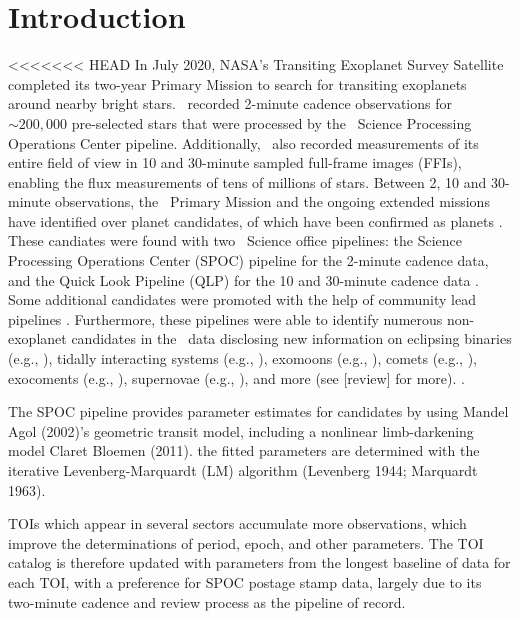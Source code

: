 \documentclass[floatfix,ApJL,twocolumn]{aastex631}
\begin{document}


\section{Introduction} \label{sec:intro}

<<<<<<< HEAD
In July 2020, NASA’s Transiting Exoplanet Survey Satellite \citep{Ricker:2015:JATIS} completed its two-year Primary Mission to search for transiting exoplanets around nearby bright stars.
\tess\ recorded 2-minute cadence observations for $\sim200,000$ pre-selected stars that were processed by the \tess\ Science Processing Operations Center \citep{Jenkins:2016:SPIE} pipeline.
Additionally, \tess\ also recorded measurements of its entire field of view in 10 and 30-minute sampled full-frame images (FFIs), enabling the flux measurements of tens of millions of stars.
Between 2, 10 and 30-minute observations, the \tess\ Primary Mission and the ongoing extended missions have identified over \red{$\numTessCandidates$} planet candidates, \red{$\numTessPlanets$} of which have been confirmed as planets \citep{Stassun:2018:AJ, Stassun:2019:AJ, Guerrero:2021:ApJS, Guerrero:2021:AAS}.
These candiates were found with two \tess\ Science office pipelines: the Science Processing Operations Center (SPOC) pipeline for the 2-minute cadence data, and the Quick Look Pipeline (QLP) for the 10 and 30-minute cadence data \citep{Guerrero:2021:ApJS}.
Some additional candidates were promoted with the help of community lead pipelines \citep{Guerrero:2021:ApJS}.
Furthermore, these pipelines were able to identify numerous non-exoplanet candidates in the \tess\ data disclosing new information on eclipsing binaries (e.g., ), tidally interacting systems (e.g., ), exomoons (e.g., ), comets (e.g., ),  exocoments (e.g., ), supernovae (e.g., ), and more (see [review] for more). .


The SPOC pipeline provides parameter estimates for candidates by using Mandel Agol (2002)'s geometric transit model, including a nonlinear limb-darkening model Claret Bloemen (2011).  the fitted parameters are determined with the iterative Levenberg-Marquardt (LM) algorithm (Levenberg 1944; Marquardt 1963).


TOIs which appear in several sectors accumulate more observations, which improve the determinations of period, epoch, and other parameters. The TOI catalog is therefore updated with parameters from the longest baseline of data for each TOI, with a preference for SPOC postage stamp data, largely due to its two-minute cadence and review process as the pipeline of record.
\end{document}
